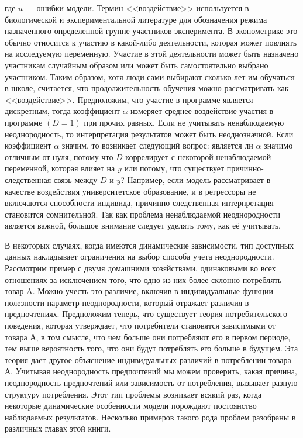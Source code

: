 где $u$ --- ошибки модели. Термин <<воздействие>> используется в биологической и экспериментальной литературе для обозначения режима назначенного определенной группе участников эксперимента. 
В эконометрике это обычно относится к участию в какой-либо деятельности, которая может повлиять на исследуемую переменную. 
Участие в этой деятельности может быть назначено  участникам случайным образом или может быть самостоятельно выбрано участником. 
Таким образом, хотя  люди сами выбирают сколько лет им обучаться в школе, считается, что продолжительность обучения можно рассматривать как <<воздействие>>. 
Предположим, что участие в программе является дискретным, тогда коэффициент $\alpha$ измеряет среднее воздействие участия в программе $(D = 1)$ при прочих равных. 
Если не учитывать ненаблюдаемую неоднородность, то интерпретация результатов может быть неоднозначной. 
Если коэффициент $\alpha$ значим, то возникает следующий вопрос: является ли $\alpha$ значимо отличным от нуля, потому что $D$ коррелирует с некоторой ненаблюдаемой переменной, которая влияет на $y$ или потому, что существует причинно-следственная связь между $D$ и $y$? 
Например, если модель рассматривает в качестве воздействия университетское образование, и в регрессоры не включаются способности индивида, причинно-следственная интерпретация становится сомнительной. Так как проблема ненаблюдаемой неоднородности является важной, большое внимание следует уделять тому, как её учитывать. 


В некоторых случаях, когда имеются динамические зависимости, тип доступных данных накладывает  ограничения на выбор способа учета неоднородности. 
Рассмотрим пример с двумя домашними хозяйствами, одинаковыми во всех отношениях за исключением того, что одно из них более склонно потреблять товар A. 
Можно учесть это различие, включив в  индивидуальные функции полезности параметр неоднородности, который отражает различия в предпочтениях. 
Предположим теперь, что существует теория потребительского поведения, которая утверждает, что потребители становятся зависимыми от товара А, в том смысле, что чем больше они потребляют его в первом периоде, тем выше вероятность того, что они будут потреблять его больше в будущем. Эта теория дает другое объяснение индивидуальных различий в потреблении товара А. Учитывая неоднородность предпочтений мы можем проверить, какая причина, неоднородность предпочтений или зависимость от потребления, вызывает разную структуру потребления. 
Этот тип проблемы возникает всякий раз, когда некоторые динамические особенности модели порождают постоянство  наблюдаемых результатов. Несколько примеров такого рода проблем разобраны в различных главах этой книги.
	
